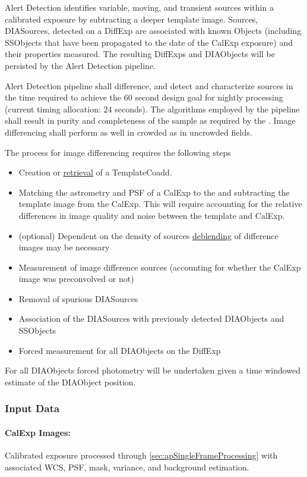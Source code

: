 Alert Detection identifies variable, moving, and transient sources within a calibrated exposure by subtracting a deeper template image. Sources, DIASources, detected on a DiffExp are associated with known Objects (including SSObjects that have been propagated to the date of the CalExp exposure) and their properties measured. The resulting DiffExps and DIAObjects will be persisted by the Alert Detection pipeline.

Alert Detection pipeline shall difference, and detect and characterize sources in the time required to achieve the 60 second design goal for nightly processing (current timing allocation: 24 seconds). The algorithms employed by the pipeline shall result in purity and completeness of the sample as required by the \DMSR\@. Image differencing shall perform as well in crowded as in uncrowded fields. 



The process for image differencing requires the following steps
\begin{itemize}
\item Creation or \hyperref[sec:acRetrieveTemplate]{retrieval} of a TemplateCoadd.
\item Matching the astrometry and PSF of a CalExp to the  and subtracting the template image from the CalExp. This will require accounting for the relative differences in image quality and noise between the template and CalExp.
\item (optional) Dependent on the density of sources \hyperref[sec:acSingleFrameDeblending]{deblending} of difference images may be necessary
\item Measurement of image difference sources (accounting for whether the CalExp image was preconvolved or not)
\item Removal of spurious DIASources 
\item Association of the DIASources with previously detected DIAObjects and SSObjects
\item Forced measurement for all DIAObjects on the DiffExp
\end{itemize}

For all DIAObjects forced photometry will be undertaken given a time windowed estimate of the DIAObject position.

\subsubsection{Input Data}
\label{sec:apADInput}

\paragraph*{CalExp Images:} Calibrated exposure processed through \ref{sec:apSingleFrameProcessing} with associated WCS, PSF, mask, variance, and background estimation.


